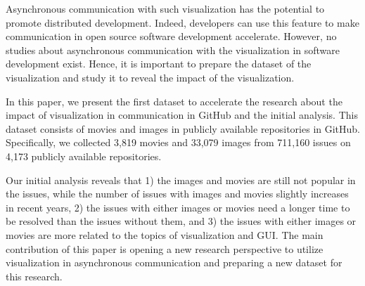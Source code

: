 Asynchronous communication with 
such visualization
has the potential 
to promote distributed development. 
Indeed, developers can use this feature to make communication 
in open source software development accelerate. 
However, no studies about asynchronous communication with 
the visualization in software development exist.
Hence, it is important to prepare the dataset of the visualization 
and study it to reveal the impact of the visualization.



In this paper, we present the first dataset to accelerate 
the research about the impact of visualization 
in communication in GitHub and the initial analysis. 
This dataset consists of movies and images 
in publicly available repositories in GitHub. 
Specifically, we collected 
3,819 movies and 
33,079 images from 
711,160 issues on
4,173 publicly available repositories.

Our initial analysis reveals that 
1) the images and movies are still not popular 
in the issues, while the number of issues with images 
and movies slightly increases in recent years, 
2) the issues with either images or movies need 
a longer time to be resolved than the issues without them, and 
3) the issues with either images or movies are more related to 
the topics of visualization and GUI. 
The main contribution of this paper is 
opening a new research perspective to utilize visualization 
in asynchronous communication and 
preparing a new dataset for this research. 